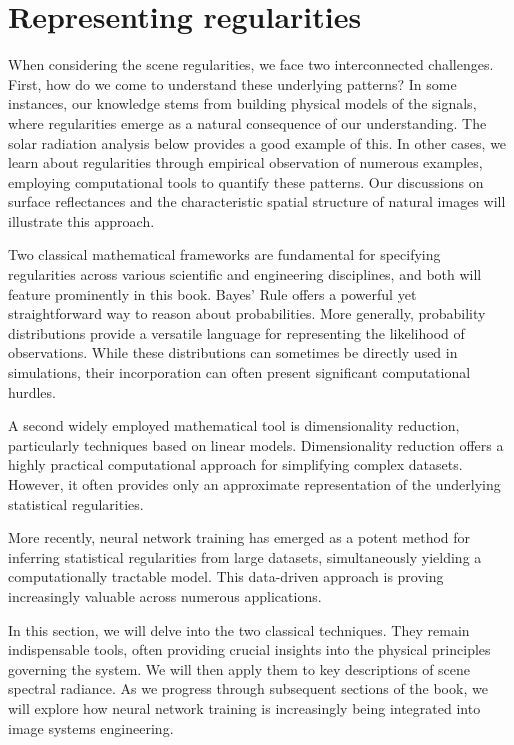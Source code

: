 \documentclass[
  letterpaper,
]{book}
\begin{document}
\section{Representing regularities}\label{representing-regularities}

When considering the scene regularities, we face two interconnected
challenges. First, how do we come to understand these underlying
patterns? In some instances, our knowledge stems from building physical
models of the signals, where regularities emerge as a natural
consequence of our understanding. The solar radiation analysis below
provides a good example of this. In other cases, we learn about
regularities through empirical observation of numerous examples,
employing computational tools to quantify these patterns. Our
discussions on surface reflectances and the characteristic spatial
structure of natural images will illustrate this approach.

Two classical mathematical frameworks are fundamental for specifying
regularities across various scientific and engineering disciplines, and
both will feature prominently in this book. Bayes' Rule offers a
powerful yet straightforward way to reason about probabilities. More
generally, probability distributions provide a versatile language for
representing the likelihood of observations. While these distributions
can sometimes be directly used in simulations, their incorporation can
often present significant computational hurdles.

A second widely employed mathematical tool is dimensionality reduction,
particularly techniques based on linear models. Dimensionality reduction
offers a highly practical computational approach for simplifying complex
datasets. However, it often provides only an approximate representation
of the underlying statistical regularities.

More recently, neural network training has emerged as a potent method
for inferring statistical regularities from large datasets,
simultaneously yielding a computationally tractable model. This
data-driven approach is proving increasingly valuable across numerous
applications.

In this section, we will delve into the two classical techniques. They
remain indispensable tools, often providing crucial insights into the
physical principles governing the system. We will then apply them to key
descriptions of scene spectral radiance. As we progress through
subsequent sections of the book, we will explore how neural network
training is increasingly being integrated into image systems
engineering.
\end{document}
